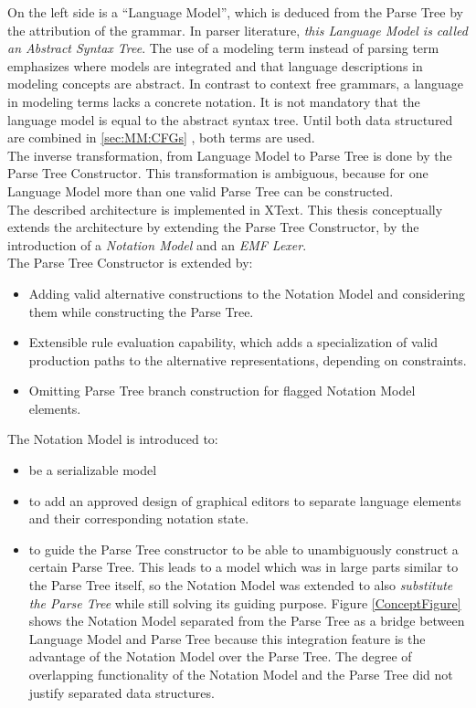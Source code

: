 On the left side is a ``Language Model'', which is deduced from the Parse Tree by the attribution of the grammar. In parser literature, \emph{this Language Model is called an Abstract Syntax Tree}. The use of a modeling term instead of parsing term emphasizes where models are integrated and that language descriptions in modeling concepts are abstract. In contrast to context free grammars, a language in modeling terms lacks a concrete notation. It is not mandatory that the language model is equal to the abstract syntax tree. Until both data structured are combined in \ref{sec:MM:CFGs} , both terms are used. \\
The inverse transformation, from Language Model to Parse Tree is done by the Parse Tree Constructor. This transformation is ambiguous, because for one Language Model more than one valid Parse Tree can be constructed. \\
The described architecture is implemented in XText. This thesis conceptually extends the architecture by extending the Parse Tree Constructor, by the introduction of a \emph{Notation Model} and an \emph{EMF Lexer}.\\
The Parse Tree Constructor is extended by:
\begin{itemize}
	\item Adding valid alternative constructions to the Notation Model and considering them while constructing the Parse Tree. 
	\item Extensible rule evaluation capability, which adds a specialization of valid production paths to the alternative representations, depending on constraints. 
	\item Omitting Parse Tree branch construction for flagged Notation Model elements.
\end{itemize}
The Notation Model is introduced to:
\begin{itemize}
	\item be a serializable model
	\item to add an approved design of graphical editors to separate language elements and their corresponding notation state.
	\item to guide the Parse Tree constructor to be able to unambiguously construct a certain Parse Tree. This leads to a model which was in large parts similar to the Parse Tree itself, so the Notation Model was extended to also \emph{substitute the Parse Tree} while still solving its guiding purpose. Figure \ref{ConceptFigure} shows the Notation Model separated from the Parse Tree as a bridge between Language Model and Parse Tree because this integration feature is the advantage of the Notation Model over the Parse Tree. The degree of overlapping functionality of the Notation Model and the Parse Tree did not justify separated data structures.
\end{itemize} 

